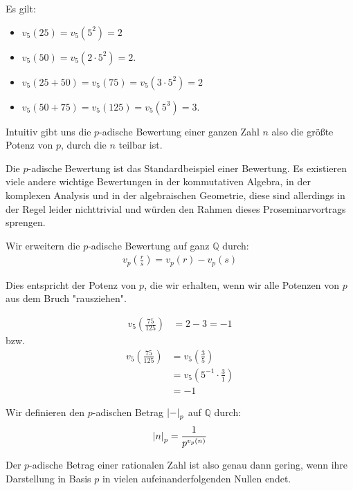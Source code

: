 \documentclass{report}
\newcommand*{\newpar}{\par\vspace{\baselineskip}\noindent}
\newcommand{\bQ}{\mathbb{Q}}
\begin{document}
	\begin{example}
		Es gilt:
		\begin{itemize}
			\item $v_5(25) = v_5(5^2) = 2$
			\item $v_5(50) = v_5(2 \cdot 5^2) = 2$.
			\item $v_5(25 + 50) = v_5(75) = v_5(3 \cdot 5^2) = 2$
			\item $v_5(50 + 75) = v_5(125) = v_5(5^3) = 3$.
		\end{itemize} 
	\end{example}
	\noindent Intuitiv gibt uns die $p$-adische Bewertung einer ganzen Zahl $n$ also die größte Potenz von $p$, durch die $n$ teilbar ist.
	\newpar
	Die $p$-adische Bewertung ist das Standardbeispiel einer Bewertung. Es existieren viele andere wichtige Bewertungen in der kommutativen Algebra, in der komplexen Analysis und in der algebraischen Geometrie, diese sind allerdings in der Regel leider nichttrivial und würden den Rahmen dieses Proseminarvortrags sprengen.\\
	\begin{definition}
		Wir erweitern die $p$-adische Bewertung auf ganz $\bQ$ durch:
		\begin{align*}
			v_p\left(\frac{r}{s}\right) = v_p(r) - v_p(s)
		\end{align*}
	\end{definition}
	\noindent Dies entspricht der Potenz von $p$, die wir erhalten, wenn wir alle Potenzen von $p$ aus dem Bruch "rausziehen".
	\begin{example}
		\begin{align*}
			v_5\left(\frac{75}{125}\right) &= 2 - 3 = -1
		\end{align*}
		bzw.
		\begin{align*}
			v_5\left(\frac{75}{125}\right) &= v_5\left(\frac{3}{5}\right)\\ &= v_5\left(5^{-1} \cdot \frac{3}{1}\right)\\
			&= -1
		\end{align*}
	\end{example}
	\begin{definition}
		Wir definieren den $p$-adischen Betrag $\abs{-}_p$ auf $\bQ$ durch:
		\begin{align*} 
			\abs{n}_p = \frac{1}{p^{v_p(n)}}
		\end{align*}
	\end{definition}
	\noindent Der $p$-adische Betrag einer rationalen Zahl ist also genau dann gering, wenn ihre Darstellung in Basis $p$ in vielen aufeinanderfolgenden Nullen endet.
\end{document}
